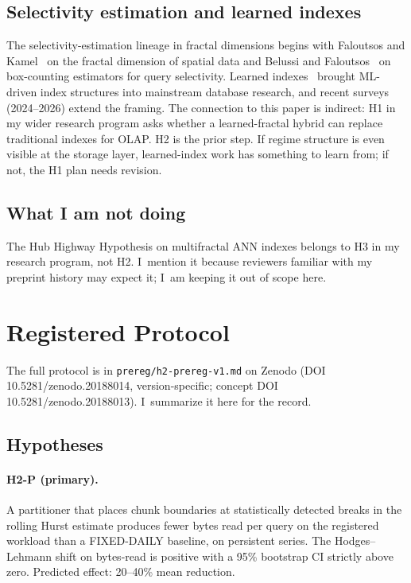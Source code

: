 \documentclass[11pt]{article}
\begin{document}
\subsection{Selectivity estimation and learned indexes}

The selectivity-estimation lineage in fractal dimensions begins with Faloutsos and Kamel~\cite{faloutsoskamel1994} on the fractal dimension of spatial data and Belussi and Faloutsos~\cite{belussifaloutsos1995} on box-counting estimators for query selectivity. Learned indexes~\cite{kraska2018learnedindex} brought ML-driven index structures into mainstream database research, and recent surveys (2024--2026) extend the framing. The connection to this paper is indirect: H1 in my wider research program asks whether a learned-fractal hybrid can replace traditional indexes for OLAP. H2 is the prior step. If regime structure is even visible at the storage layer, learned-index work has something to learn from; if not, the H1 plan needs revision.

\subsection{What I am not doing}

The Hub Highway Hypothesis on multifractal ANN indexes belongs to H3 in my research program, not H2. I~mention it because reviewers familiar with my preprint history may expect it; I~am keeping it out of scope here.

\section{Registered Protocol}

The full protocol is in \texttt{prereg/h2-prereg-v1.md} on Zenodo (DOI 10.5281/zenodo.20188014, version-specific; concept DOI 10.5281/zenodo.20188013). I~summarize it here for the record.

\subsection{Hypotheses}

\paragraph{H2-P (primary).} A partitioner that places chunk boundaries at statistically detected breaks in the rolling Hurst estimate produces fewer bytes read per query on the registered workload than a FIXED-DAILY baseline, on persistent series. The Hodges--Lehmann shift on bytes-read is positive with a 95\% bootstrap CI strictly above zero. Predicted effect: 20--40\% mean reduction.
\end{document}
